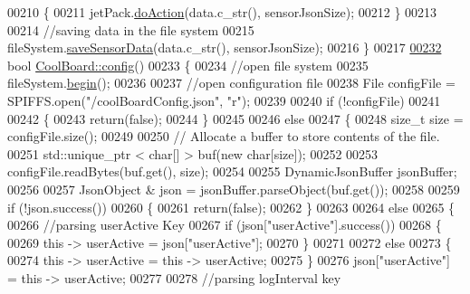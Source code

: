 \begin{DoxyCode}
00210     \{
00211         jetPack.\hyperlink{class_jetpack_a86d2e83436ef4b85f4c3a6e85ac785b0}{doAction}(data.c\_str(), sensorJsonSize);
00212     \}
00213     
00214     \textcolor{comment}{//saving data in the file system}
00215     fileSystem.\hyperlink{class_cool_file_system_a4c560c2ddd40b74b7758e6ceb2c58957}{saveSensorData}(data.c\_str(), sensorJsonSize);
00216 \}
00217 
\hyperlink{class_cool_board_a583a874c09c07e70a6eb9229fc4beddb}{00232} \textcolor{keywordtype}{bool} \hyperlink{class_cool_board_a583a874c09c07e70a6eb9229fc4beddb}{CoolBoard::config}()
00233 \{
00234     \textcolor{comment}{//open file system}
00235     fileSystem.\hyperlink{class_cool_file_system_a6ba6f666ed4c530174f8569d2c636748}{begin}();
00236     
00237     \textcolor{comment}{//open configuration file}
00238     File configFile = SPIFFS.open(\textcolor{stringliteral}{"/coolBoardConfig.json"}, \textcolor{stringliteral}{"r"});
00239     
00240     \textcolor{keywordflow}{if} (!configFile)
00241 
00242     \{
00243         \textcolor{keywordflow}{return}(\textcolor{keyword}{false});
00244     \}
00245 
00246     \textcolor{keywordflow}{else}
00247     \{
00248         \textcolor{keywordtype}{size\_t} size = configFile.size();
00249 
00250         \textcolor{comment}{// Allocate a buffer to store contents of the file.}
00251         std::unique\_ptr < char[] > buf(\textcolor{keyword}{new} \textcolor{keywordtype}{char}[size]);
00252 
00253         configFile.readBytes(buf.get(), size);
00254 
00255         DynamicJsonBuffer jsonBuffer;
00256 
00257         JsonObject & json = jsonBuffer.parseObject(buf.get());
00258 
00259         \textcolor{keywordflow}{if} (!json.success())
00260         \{
00261             \textcolor{keywordflow}{return}(\textcolor{keyword}{false});
00262         \}
00263 
00264         \textcolor{keywordflow}{else}
00265         \{   
00266             \textcolor{comment}{//parsing userActive Key}
00267             \textcolor{keywordflow}{if} (json[\textcolor{stringliteral}{"userActive"}].success())
00268             \{
00269                 \textcolor{keyword}{this} -> userActive = json[\textcolor{stringliteral}{"userActive"}];
00270             \}
00271 
00272             \textcolor{keywordflow}{else}
00273             \{
00274                 \textcolor{keyword}{this} -> userActive = \textcolor{keyword}{this} -> userActive;
00275             \}
00276             json[\textcolor{stringliteral}{"userActive"}] = \textcolor{keyword}{this} -> userActive;
00277 
00278             \textcolor{comment}{//parsing logInterval key}

\end{DoxyCode}
